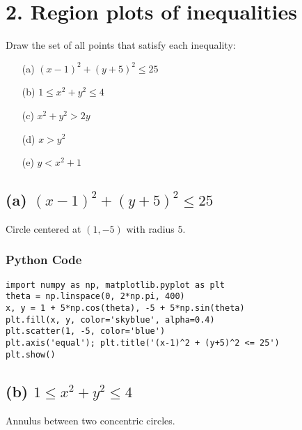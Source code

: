 \documentclass[10pt,twocolumn]{article}
\begin{document}
\section*{2. Region plots of inequalities}

\begin{tcolorbox}
Draw the set of all points that satisfy each inequality:
\begin{enumerate}
\item[(a)] $(x-1)^{2}+(y+5)^{2}\le25$
\item[(b)] $1\le x^{2}+y^{2}\le4$
\item[(c)] $x^{2}+y^{2}>2y$
\item[(d)] $x>y^{2}$
\item[(e)] $y<x^{2}+1$
\end{enumerate}
\end{tcolorbox}

\subsection*{(a) $(x-1)^{2}+(y+5)^{2}\le25$}
Circle centered at $(1,-5)$ with radius $5$.

\begin{center}
\end{center}

\subsubsection*{Python Code}
\begin{verbatim}
import numpy as np, matplotlib.pyplot as plt
theta = np.linspace(0, 2*np.pi, 400)
x, y = 1 + 5*np.cos(theta), -5 + 5*np.sin(theta)
plt.fill(x, y, color='skyblue', alpha=0.4)
plt.scatter(1, -5, color='blue')
plt.axis('equal'); plt.title('(x-1)^2 + (y+5)^2 <= 25')
plt.show()
\end{verbatim}

\subsection*{(b) $1 \le x^{2}+y^{2} \le 4$}
Annulus between two concentric circles.
\end{document}
